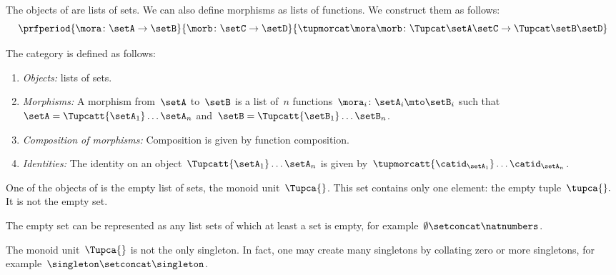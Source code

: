 The objects of \SetL are lists of sets.
We can also define morphisms as lists of functions.
We construct them as follows:
%
\begin{equation}
    \label{eq:sets-monoid-maps2}
    \prfperiod{
        \mora \colon \setA \to \setB
    }{
        \morb \colon \setC \to \setD
    }{
        \tupmorcat \mora \morb \colon \Tupcat \setA   \setC \to \Tupcat \setB  \setD
    }
\end{equation}
%
\begin{definition}
    \label{def:SetL}
    The category \SetL is defined as follows:
    \begin{enumerate}
        \item \emph{Objects:} lists of sets.
        \item \emph{Morphisms:}
              A morphism from~$\setA$ to~$\setB$ is a list of~$n$ functions~$\mora_i\colon \setA_i \mto \setB_i$ such that~$\setA = \Tupcatt {\setA_1}  \dots {\setA_n}$ and~$\setB = \Tupcatt {\setB_1} \dots {\setB_n}$.
        \item \emph{Composition of morphisms:}
              Composition is given by function composition.
        \item \emph{Identities:}
              The identity on an object~$\Tupcatt {\setA_1} \dots {\setA_n}$ is given by~$\tupmorcatt {\catid_{\setA_1}} \dots  {\catid_{\setA_n}} $.
    \end{enumerate}
\end{definition}


One of the objects of \SetL is the empty list of sets, the monoid unit~$\Tupca{ }$.
This set contains only one element: the empty tuple~$\tupca{ }.
$
It is not the empty set.

The empty set can be represented as any list sets of which at least a set is empty, for example~$\emptyset \setconcat \natnumbers$.

The monoid unit~$\Tupca{ }$ is not the only singleton.
In fact, one may create many singletons by collating zero or more singletons, for example~$\singleton \setconcat \singleton$.

%

\showslides{
    \begin{forslides}

        \begin{equation}
            \tupca \ela   = \ela
        \end{equation}
        ~
        \begin{equation}
            \label{eq:sets-monoid-el-cat}
            \tupcat \ela \elb \elconcat \elc = \tupcatt \ela \elb \elc
        \end{equation}
    \end{forslides}
}
